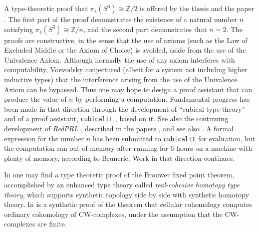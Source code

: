 \documentclass[letter,12pt]{amsart}
\theoremstyle{definition}
\theoremstyle{remark}
\numberwithin{equation}{section}
\newcommand{\ZZ}{\mathbb{Z}}
\begin{document}
A type-theoretic proof that $\pi_4 (S^3) \cong \ZZ/2$ is offered by the thesis \citep{1606.05916} and the paper \citep{1710.10307}.
The first part of the proof demonstrates the
existence of a natural number $n$ satisfying $\pi_4 (S^3) \cong \ZZ/n$, and the second part demonstrates that $n=2$.  The proofs are
constructive, in the sense that the use of axioms (such as the Law of Excluded Middle or the Axiom of Choice) is avoided, aside from the use of
the Univalence Axiom.  Although normally the use of any axiom interferes with computability, Voevodsky conjectured (albeit for a system not
including higher inductive types) that the interference arising from the use of the Univalence Axiom can be bypassed.  Thus one may hope to
design a proof assistant that can produce the value of $n$ by performing a computation.  Fundamental progress has been made in that direction
through the development of ``cubical type theory'' \citep{MR3281415,1611.02108,1802.01170} and of a proof assistant, {\tt cubicaltt} \citep{cubicaltt}, based
on it.  See also the continuing development of {\em RedPRL} \citep{RedPRL}, described in the papers
\citep{harper-et-al-1,harper-et-al-2,harper-et-al-3,harper-et-al-4}, and see also \citep{cart-cube}.
A formal expression for the number $n$ has been submitted to {\tt cubicaltt} for
evaluation, but the computation ran out of memory after running for 6 hours on a machine with plenty of memory, according to Brunerie.  Work in
that direction continues.

In \citep{1509.07584} one may find a type theoretic proof of the Brouwer fixed point theorem, accomplished by an enhanced type theory called
{\em real-cohesive homotopy type theory}, which supports synthetic topology side by side with synthetic homotopy theory.
In \citep{1802.02191} is a synthetic proof of the theorem that cellular cohomology computes ordinary cohomology of CW-complexes, under the
assumption that the CW-complexes are finite.

\raggedright


\end{document}
